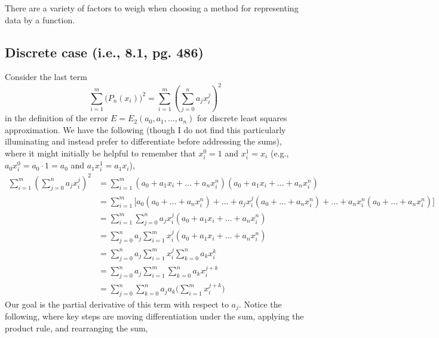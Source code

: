 \documentclass[11pt]{article}
\begin{document}
\noindent There are a variety of factors to weigh when choosing a method for representing data by a function.


\subsection*{Discrete case (i.e., 8.1, pg. 486)}
Consider the last term \[\sum_{i=1}^m\Big(P_n(x_i)\Big)^2 = \sum_{i=1}^m \left(\sum_{j=0}^n a_j x_i^j\right)^2\] in the definition of the error \(E = E_2(a_0, a_1, \dots, a_n)\) for discrete least squares approximation. We have the following (though I do not find this particularly illuminating and instead prefer to differentiate before addressing the sums), where it might initially be helpful to remember that \(x_i^0 = 1\) and \(x_i^1 = x_i\) (e.g., \(a_0 x_i^0 = a_0\cdot1 =a_0\) and \(a_1 x_i^1 = a_1x_i\)), 
\begin{align*}
 \sum_{i=1}^m \left(\sum_{j=0}^n a_j x_i^j\right)^2 & = \sum_{i=1}^m (a_0 + a_1x_i+ \dots + a_n x_i^n)(a_0 + a_1x_i + \dots + a_n x_i^n)\\
 & = \sum_{i=1}^m \Big[a_0 (a_0 + \dots + a_n x_i^n) + \dots + a_jx_i^j(a_0 + \dots + a_n x_i^n) + \dots + a_n x_i^n(a_0 + \dots + a_n x_i^n)\Big]\\
 & = \sum_{i=1}^m \sum_{j=0}^n a_jx_i^j(a_0 + a_1x_i + \dots + a_n x_i^n)\\
 & = \sum_{j=0}^n a_j \sum_{i=1}^m x_i^j(a_0 + a_1x_i + \dots + a_n x_i^n)\\
 & = \sum_{j=0}^n a_j \sum_{i=1}^m x_i^j \sum_{k=0}^n a_k x_i^k\\
 & = \sum_{j=0}^n a_j \sum_{i=1}^m \sum_{k=0}^n a_k x_i^{j+k}\\
 & = \sum_{j=0}^n\sum_{k=0}^n a_ja_k\Big(\sum_{i=1}^m x_i^{j+k}\Big)
 \end{align*}
Our goal is the partial derivative of this term with respect to \(a_j\). Notice the following, where key steps are moving differentiation under the sum, applying the product rule, and rearranging the sum,
\end{document}
